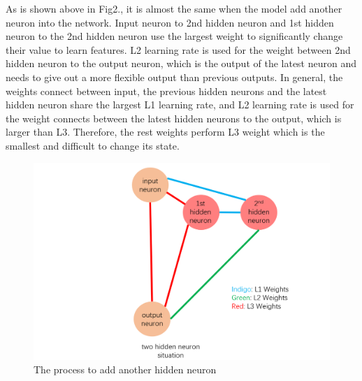 As is shown above in Fig2., it is almost the same when the model add another neuron into the network. Input neuron to 2nd hidden neuron and 1st hidden neuron to the 2nd hidden neuron use the largest weight to significantly change their value to learn features. L2 learning rate is used for the weight between 2nd hidden neuron to the output neuron, which is the output of the latest neuron and needs to give out a more flexible output than previous outputs. In general, the weights connect between input, the previous hidden neurons and the latest hidden neuron share the largest L1 learning rate, and L2 learning rate is used for the weight connects between the latest hidden neurons to the output, which is larger than L3. Therefore, the rest weights perform L3 weight which is the smallest and difficult to change its state.\\
\begin{figure}[H]
\centering
\includegraphics[width=\textwidth]{images/reimg2.png}
\caption{The process to add another hidden neuron}
\label{figure2}  
\end{figure}

